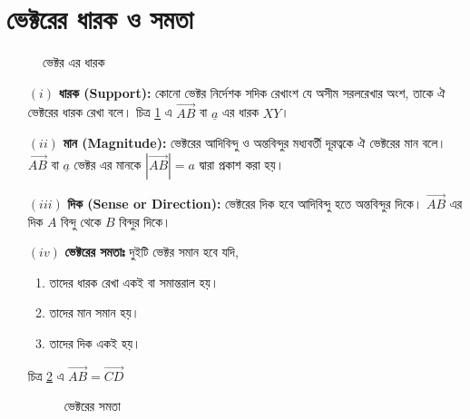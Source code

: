 \section*{ভেক্টরের ধারক ও সমতা }
\begin{figure}[h]
	\centering
	
	\caption{ভেক্টর এর ধারক}
	\label{vec-fig-1}
\end{figure}
\begin{itemize}
	\item[$(i)$] \textbf{ধারক (Support):} কোনো ভেক্টর নির্দেশক সদিক রেখাংশ যে অসীম সরলরেখার অংশ, তাকে ঐ ভেক্টরের ধারক রেখা বলে। চিত্র \ref{vec-fig-1} এ $\overrightarrow{AB}$ বা $\underline{a}$ এর ধারক $XY$। 
	\item[$(ii)$] \textbf{মান (Magnitude):} ভেক্টরের আদিবিন্দু ও অন্তবিন্দুর মধ্যবর্তী দূরত্বকে ঐ ভেক্টরের মান বলে। $\overrightarrow{AB}$ বা $\underline{a}$ ভেক্টর এর মানকে $|\overrightarrow{AB}|=a$ দ্বারা প্রকাশ করা হয়। 
	\item[$(iii)$] \textbf{দিক (Sense or Direction):} ভেক্টরের দিক হবে আদিবিন্দু হতে অন্তবিন্দুর দিকে। $\overrightarrow{AB}$ এর দিক $A$ বিন্দু থেকে $B$ বিন্দুর দিকে। 
	\item[$(iv)$] \textbf{ভেক্টরের সমতাঃ} দুইটি ভেক্টর সমান হবে যদি, 
	\begin{enumerate}
		\item তাদের ধারক রেখা একই বা সমান্তরাল হয়। 
		\item তাদের মান সমান হয়।
		\item তাদের দিক একই হয়।  
	\end{enumerate}
	চিত্র \ref{vec-fig-2} এ $\overrightarrow{AB}=\overrightarrow{CD}$
	\begin{figure}[h]
		\centering
		
		\caption{ভেক্টরের সমতা}
		\label{vec-fig-2}
	\end{figure}
\end{itemize}

